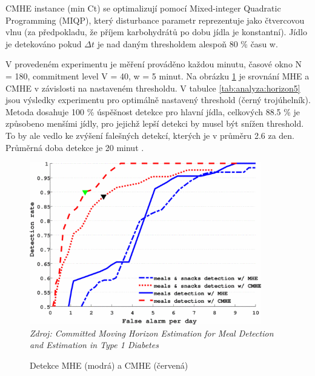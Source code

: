 CMHE instance (min Ct) se optimalizují pomocí Mixed-integer Quadratic Programming (MIQP), který disturbance parametr reprezentuje jako čtvercovou vlnu (za předpokladu, že příjem karbohydrátů po dobu jídla je konstantní). Jídlo je detekováno pokud $\Delta t$ je nad daným thresholdem alespoň 80 \% času w.

V provedeném experimentu je měření prováděno každou minutu, časové okno N = 180, commitment level V = 40, w = 5 minut. Na obrázku \ref{fig:analyza:horizon4} je srovnání MHE a CMHE v závislosti na nastaveném thresholdu.  V tabulce \ref{tab:analyza:horizon5} jsou výsledky experimentu pro optimálně nastavený threshold (černý trojúhelník). Metoda dosahuje 100 \% úspěšnost detekce pro hlavní jídla, celkových 88.5 \% je způsobeno menšími jídly, pro jejichž lepší detekci by musel být snížen threshold. To by ale vedlo ke zvýšení falešných detekcí, kterých je v průměru 2.6 za den. Průměrná doba detekce je 20 minut \citep{analyzaCHO.MovingHorizon}.

\begin{figure}[H]
\caption{Detekce MHE (modrá) a CMHE (červená)}
\label{fig:analyza:horizon4}
\centering
\includegraphics[width=0.9\textwidth]{img/analyzaCHO/horizon4.png}\\
\textit{Zdroj: Committed Moving Horizon Estimation for Meal Detection and Estimation in Type 1 Diabetes \citep{analyzaCHO.MovingHorizon}}
\end{figure}

